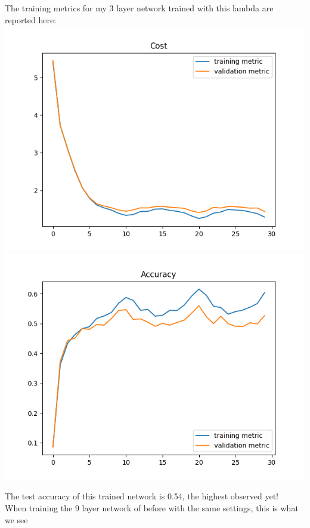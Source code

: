 \documentclass[11pt,a4paper]{article}
\begin{document}
The training metrics for my 3 layer network trained with this lambda are reported here:\\

\includegraphics[width=\textwidth]{optimal_cost_k=3.png}
\includegraphics[width=\textwidth]{optimal_accuracy_k=3.png}

The test accuracy of this trained network is 0.54, the highest observed yet!\\

When training the 9 layer network of before with the same settings, this is what we see\\
\end{document}
